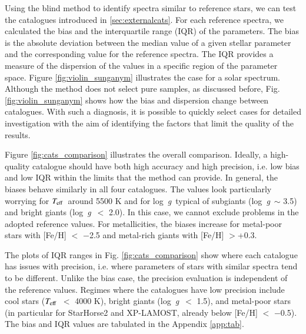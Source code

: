 \documentclass{aa}
\def\teff{$\textit{T}_{\rm{eff}}$}
\def\logg{\mbox{log~{\it g}}}
\begin{document}
Using the blind method to identify spectra similar to reference stars, we can test the catalogues introduced in \ref{sec:externalcats}. For each reference spectra, we calculated the bias and the interquartile range (IQR) of the parameters. The bias is the absolute deviation between the median value of a given stellar parameter and the corresponding value for the reference spectra. The IQR provides a measure of the dispersion of the values in a specific region of the parameter space. Figure \ref{fig:violin_sunganym} illustrates the case for a solar spectrum. Although the method does not select pure samples, as discussed before, Fig. \ref{fig:violin_sunganym} shows how the bias and dispersion change between catalogues. With such a diagnosis, it is possible to quickly select cases for detailed investigation with the aim of identifying the factors that limit the quality of the results.

Figure \ref{fig:cats_comparison} illustrates the overall comparison. Ideally, a high-quality catalogue should have both high accuracy and high precision, i.e. low bias and low IQR within the limits that the method can provide. In general, the biases behave similarly in all four catalogues. The values look particularly worrying for \teff~around 5500 K and for \logg~typical of subgiants (\logg~$\sim$ 3.5) and bright giants (\logg~$<$ 2.0). In this case, we cannot exclude problems in the adopted reference values. For metallicities, the biases increase for metal-poor stars with [Fe/H] $<$ $-$2.5 and metal-rich giants with [Fe/H] $>$+0.3.

The plots of IQR ranges in Fig. \ref{fig:cats_comparison} show where each catalogue has issues with precision, i.e. where parameters of stars with similar spectra tend to be different. Unlike the bias case, the precision evaluation is independent of the reference values. Regimes where the catalogues have low precision include cool stars (\teff~$<$ 4000 K), bright giants (\logg~$<$ 1.5), and metal-poor stars (in particular for StarHorse2 and XP-LAMOST, already below [Fe/H] $<$ $-$0.5). The bias and IQR values are tabulated in the Appendix \ref{app:tab}.
\end{document}

